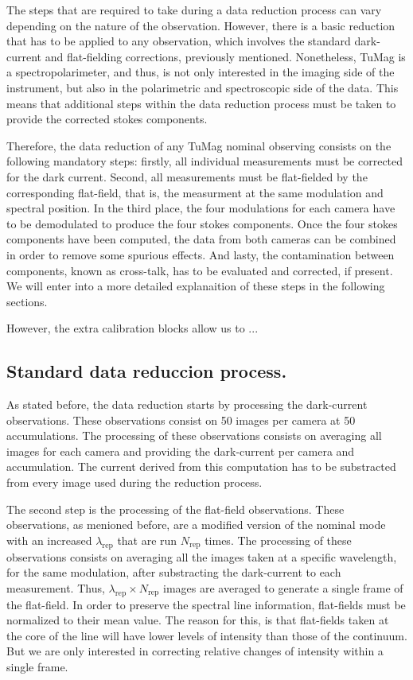 The steps that are required to take during a data reduction process can vary depending on the nature of the observation. However, there is a basic reduction that has to be applied to any observation, which involves the standard dark-current and flat-fielding corrections, previously mentioned. Nonetheless, TuMag is a spectropolarimeter, and thus, is not only interested in the imaging side of the instrument, but also in the polarimetric and spectroscopic side of the data. This means that additional steps within the data reduction process must be taken to provide the corrected stokes components.

Therefore, the data reduction of any TuMag nominal observing consists on the following mandatory steps: firstly, all individual measurements must be corrected for the dark current. Second, all measurements must be flat-fielded by the corresponding flat-field, that is, the measurment at the same modulation and spectral position. In the third place, the four modulations for each camera have to be demodulated to produce the four stokes components. Once the four stokes components have been computed, the data from both cameras can be combined in order to remove some spurious effects. And lasty, the contamination between components, known as cross-talk, has to be evaluated and corrected, if present. We will enter into a more detailed explanaition of these steps in the following sections. 

However, the extra calibration blocks allow us to ... 

\subsection{Standard data reduccion process.}

As stated before, the data reduction starts by processing the dark-current observations. These observations consist on 50 images per camera at 50 accumulations. The processing of these observations consists on averaging all images for each camera and providing the dark-current per camera and accumulation. The current derived from this computation has to be substracted from every image used during the reduction process. 

The second step is the processing of the flat-field observations. These observations, as menioned before, are a modified version of the nominal mode with an increased $\lambda_{\text{rep}}$ that are run $N_{\text{rep}}$ times. The processing of these observations consists on averaging all the images taken at a specific wavelength, for the same modulation, after substracting the dark-current to each measurement. Thus, $\lambda _ {\text{rep}} \times N_{\text{rep}}$ images are averaged to generate a single frame of the flat-field. In order to preserve the spectral line information, flat-fields must be normalized to their mean value. The reason for this, is that flat-fields taken at the core of the line will have lower levels of intensity than those of the continuum. But we are only interested in correcting relative changes of intensity within a single frame. 

